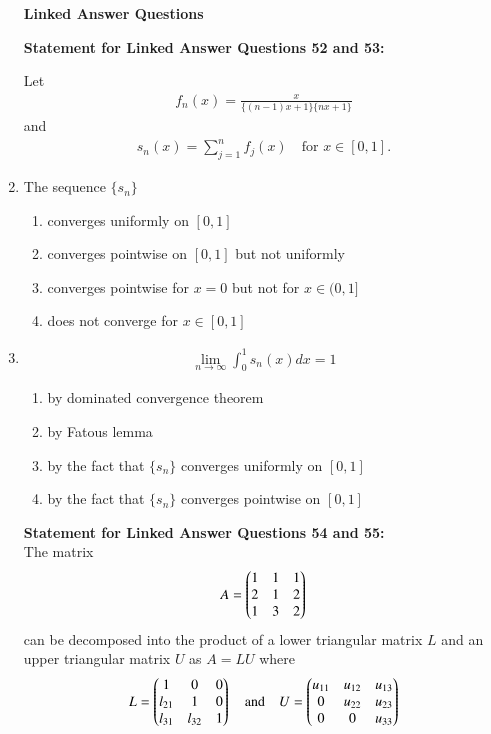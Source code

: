 \documentclass[journal]{IEEEtran}
\numberwithin{equation}{enumi}
\numberwithin{figure}{enumi}
\begin{document}
\begin{enumerate}
\vspace{0.5em}
\textbf{Linked Answer Questions}
\vspace{0.5em}

\textbf{Statement for Linked Answer Questions 52 and 53:}

Let 
\begin{align*}
f_n(x) = \frac{x}{\{(n-1)x + 1\}\{nx + 1\}}
\end{align*}
and
\begin{align*}
s_n(x) = \sum_{j=1}^n f_j(x) \quad \text{for } x \in [0,1].
\end{align*}

\item The sequence $\{s_n\}$
\hfill{}
 \begin{enumerate}
 \item  converges uniformly on $[0,1]$ 
 \item  converges pointwise on $[0,1]$ but not uniformly 
 \item  converges pointwise for $x = 0$ but not for $x \in (0,1]$ 
 \item  does not converge for $x \in [0,1]$
  \end{enumerate}



\item
\begin{align*}
\lim_{n \to \infty} \int_0^1 s_n(x) dx = 1
\end{align*}
\begin{enumerate}
\item by dominated convergence theorem 
\item by Fatous lemma 
\item by the fact that $\{s_n\}$ converges uniformly on $[0,1]$ 
\item by the fact that $\{s_n\}$ converges pointwise on $[0,1]$  \hfill{}
 \end{enumerate}

\vspace{0.5em}
\textbf{Statement for Linked Answer Questions 54 and 55:}\\
\vspace{0.5em}
The matrix 
\begin{align*}
A = \begin{pmatrix}
1 & 1 & 1 \\
2 & 1 & 2 \\
1 & 3 & 2
\end{pmatrix}
\end{align*}
can be decomposed into the product of a lower triangular matrix $L$ and an upper triangular matrix $U$ as $A = LU$ where
\begin{align*}
L = \begin{pmatrix}
1 & 0 & 0 \\
l_{21} & 1 & 0 \\
l_{31} & l_{32} & 1
\end{pmatrix}
\quad \text{and} \quad
U = \begin{pmatrix}
u_{11} & u_{12} & u_{13} \\
0 & u_{22} & u_{23} \\
0 & 0 & u_{33}
\end{pmatrix}
\end{align*}


\end{enumerate}
\end{document}
